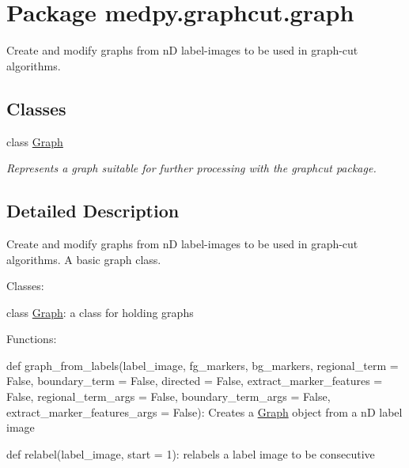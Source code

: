 \hypertarget{namespacemedpy_1_1graphcut_1_1graph}{
\section{Package medpy.graphcut.graph}
\label{namespacemedpy_1_1graphcut_1_1graph}
}


Create and modify graphs from nD label-\/images to be used in graph-\/cut algorithms.  


\subsection*{Classes}
\begin{DoxyCompactItemize}
\item 
class \hyperlink{classmedpy_1_1graphcut_1_1graph_1_1Graph}{Graph}
\begin{DoxyCompactList}\small\item\em Represents a graph suitable for further processing with the graphcut package. \end{DoxyCompactList}\end{DoxyCompactItemize}


\subsection{Detailed Description}
Create and modify graphs from nD label-\/images to be used in graph-\/cut algorithms. A basic graph class.

Classes:
\begin{DoxyItemize}
\item class \hyperlink{classmedpy_1_1graphcut_1_1graph_1_1Graph}{Graph}: a class for holding graphs
\end{DoxyItemize}

Functions:
\begin{DoxyItemize}
\item def graph\_\-from\_\-labels(label\_\-image, fg\_\-markers, bg\_\-markers, regional\_\-term = False, boundary\_\-term = False, directed = False, extract\_\-marker\_\-features = False, regional\_\-term\_\-args = False, boundary\_\-term\_\-args = False, extract\_\-marker\_\-features\_\-args = False): Creates a \hyperlink{classmedpy_1_1graphcut_1_1graph_1_1Graph}{Graph} object from a nD label image
\item def relabel(label\_\-image, start = 1): relabels a label image to be consecutive
\end{DoxyItemize}

